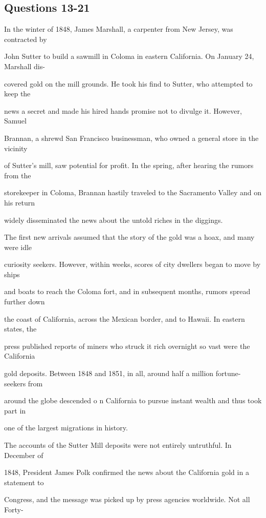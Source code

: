 \documentclass[12pt]{article}
\begin{document}
\subsection*{Questions 13-21}
\begingroup
\small
\sloppy
\setlength{\parskip}{0pt}
\setlength{\parindent}{0pt}
In the winter of 1848, James Marshall, a carpenter from New Jersey, was contracted by\par
John Sutter to build a sawmill in Coloma in eastern California. On January 24, Marshall dis-\par
covered gold on the mill grounds. He took his find to Sutter, who attempted to keep the\par
news a secret and made his hired hands promise not to divulge it. However, Samuel\par
Brannan, a shrewd San Francisco businessman, who owned a general store in the vicinity\par
of Sutter's mill, saw potential for profit. In the spring, after hearing the rumors from the\par
storekeeper in Coloma, Brannan hastily traveled to the Sacramento Valley and on his return\par
widely disseminated the news about the untold riches in the diggings.\par
The first new arrivals assumed that the story of the gold was a hoax, and many were idle\par
curiosity seekers. However, within weeks, scores of city dwellers began to move by ships\par
and boats to reach the Coloma fort, and in subsequent months, rumors spread further down\par
the coast of California, across the Mexican border, and to Hawaii. In eastern states, the\par
press published reports of miners who struck it rich overnight so vast were the California\par
gold deposits. Between 1848 and 1851, in all, around half a million fortune-seekers from\par
around the globe descended o n California to pursue instant wealth and thus took part in\par
one of the largest migrations in history.\par
The accounts of the Sutter Mill deposits were not entirely untruthful. In December of\par
1848, President James Polk confirmed the news about the California gold in a statement to\par
Congress, and the message was picked up by press agencies worldwide. Not all Forty-\par
\end{document}
